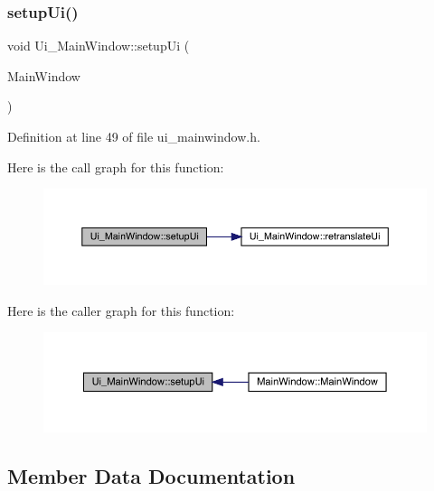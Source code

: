 \subsubsection{\texorpdfstring{setup\+Ui()}{setupUi()}}
{\footnotesize\ttfamily void Ui\+\_\+\+Main\+Window\+::setup\+Ui (\begin{DoxyParamCaption}\item[{Q\+Main\+Window $\ast$}]{Main\+Window }\end{DoxyParamCaption})\hspace{0.3cm}{\ttfamily [inline]}}



Definition at line 49 of file ui\+\_\+mainwindow.\+h.

Here is the call graph for this function\+:
\nopagebreak
\begin{figure}[H]
\begin{center}
\leavevmode
\includegraphics[width=350pt]{class_ui___main_window_acf4a0872c4c77d8f43a2ec66ed849b58_cgraph}
\end{center}
\end{figure}
Here is the caller graph for this function\+:
\nopagebreak
\begin{figure}[H]
\begin{center}
\leavevmode
\includegraphics[width=350pt]{class_ui___main_window_acf4a0872c4c77d8f43a2ec66ed849b58_icgraph}
\end{center}
\end{figure}


\subsection{Member Data Documentation}
\mbox{\label{class_ui___main_window_a30075506c2116c3ed4ff25e07ae75f81}} 
